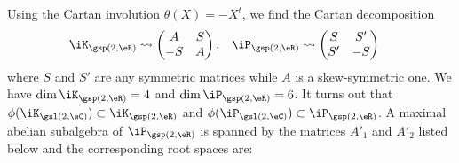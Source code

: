 Using the Cartan involution $\theta(X)=-X^t$, we find the Cartan decomposition
\begin{align}
\iK_{\gsp(2,\eR)}&\leadsto
\begin{pmatrix}
A&S\\-S&A
\end{pmatrix},
&\iP_{\gsp(2,\eR)}&\leadsto
\begin{pmatrix}
S&S'\\S'&-S
\end{pmatrix}
\end{align}
where $S$ and $S'$ are any symmetric matrices while $A$ is a skew-symmetric one. We have $\dim\iK_{\gsp(2,\eR)}=4$ and $\dim\iP_{\gsp(2,\eR)}=6$. It turns out that $\phi(\iK_{\gsl(2,\eC)})\subset\iK_{\gsp(2,\eR)}$ and $\phi(\iP_{\gsl(2,\eC)})\subset \iP_{\gsp(2,\eR)}$. A maximal abelian subalgebra of $\iP_{\gsp(2,\eR)}$ is spanned by the matrices $A'_1$ and $A'_2$ listed below and the corresponding root spaces are:
